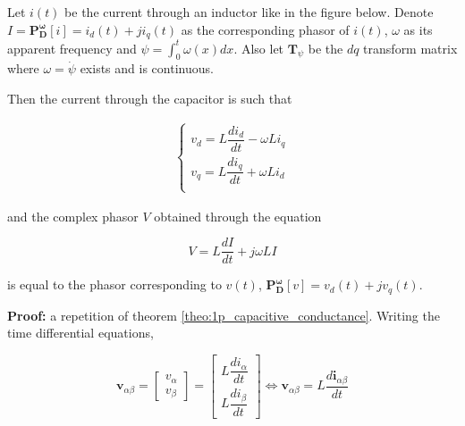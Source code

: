 \begin{theorem}\label{theo:1p_inductive_impedance} %
Let $i(t)$ be the current through an inductor like in the figure below. Denote $I =\mathbf{P_D^{\omega}} \left[i\right] = i_d\left(t\right) + ji_q\left(t\right)$ as the corresponding phasor of $i(t)$, $\omega$ as its apparent frequency and $\psi = \int_{0}^{t} \omega(x)dx$. Also let $\mathbf{T}_\psi$ be the $dq$ transform matrix where $\omega = \dot{\psi}$ exists and is continuous.

\begin{center}
\end{center}

	Then the current through the capacitor is such that

\begin{align}
\left\{\begin{array}{l}
        v_d = L\dfrac{di_d}{dt} - \omega L i_q \\[5mm]
        v_q = L\dfrac{di_q}{dt} + \omega L i_d \\[5mm]
\end{array}\right.
\end{align}

	\noindent and the complex phasor $V$ obtained through the equation

\begin{equation} V = L\dfrac{dI}{dt} + j\omega L I \end{equation}

	is equal to the phasor corresponding to $v(t)$, $\mathbf{P_D^{\omega}}\left[v\right] = v_d\left(t\right) + jv_q\left(t\right)$.

\end{theorem}
\textbf{Proof:} a repetition of theorem \ref{theo:1p_capacitive_conductance}. Writing the time differential equations,

\begin{equation} \mathbf{v}_{\alpha\beta} = 
\left[\begin{array}{c} v_\alpha \\ v_\beta \end{array}\right] = 
\left[\begin{array}{c} L\dfrac{di_\alpha}{dt} \\[5mm] L\dfrac{di_\beta}{dt} \end{array}\right] \Leftrightarrow
\mathbf{v}_{\alpha\beta} = L\dfrac{d\mathbf{i}_{\alpha\beta}}{dt} \end{equation}

